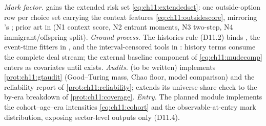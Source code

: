 \begin{codehooks}
\emph{Mark factor.}  gains the extended risk
set \cref{eq:ch11:extendedset}: one outside-option row per choice set
carrying the context features \cref{eq:ch11:outsidescore}, mirroring
's
; prior art in
(N1 context score, N2 entrant moments, N3 two-step, N4
immigrant/offspring split).
\emph{Ground process.} The histories rule (D11.2) binds
, the event-time fitters in
, and the interval-censored tools in
: history terms consume the complete deal stream; the
external baseline component of \cref{eq:ch11:mudecomp} enters as
covariates until  exists.
\emph{Audits.}  (to be written) implements
\cref{prot:ch11:gtaudit} (Good--Turing mass, Chao floor, model
comparison) and the reliability report of \cref{prot:ch11:reliability};
 extends its universe-share check to the by-era
breakdown of \cref{prot:ch11:coverage}.
\emph{Entry.} The planned  module implements the
cohort--age--era intensities \cref{eq:ch11:cohort} and the
observable-at-entry mark distribution, exposing sector-level outputs
only (D11.4).
\end{codehooks}
